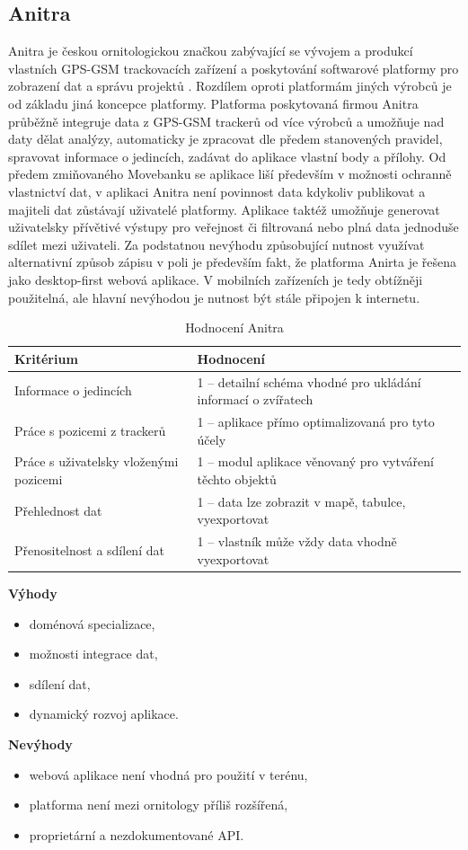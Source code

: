 \subsection{Anitra}

Anitra je českou ornitologickou značkou zabývající se vývojem a produkcí vlastních GPS-GSM trackovacích zařízení a poskytování softwarové platformy pro zobrazení dat a správu projektů \cite{krouzkovaniPtakuAnitra}. Rozdílem oproti platformám jiných výrobců je od základu jiná koncepce platformy. Platforma poskytovaná firmou Anitra průběžně integruje data z GPS-GSM trackerů od více výrobců a umožňuje nad daty dělat analýzy, automaticky je zpracovat dle předem stanovených pravidel, spravovat informace o jedincích, zadávat do aplikace vlastní body a přílohy. Od předem zmiňovaného Movebanku se aplikace liší především v možnosti ochranně vlastnictví dat, v aplikaci Anitra není povinnost data kdykoliv publikovat a majiteli dat zůstávají uživatelé platformy. Aplikace taktéž umožňuje generovat uživatelsky přívětivé výstupy pro veřejnost či filtrovaná nebo plná data jednoduše sdílet mezi uživateli. Za podstatnou nevýhodu způsobující nutnost využívat alternativní způsob zápisu v poli je především fakt, že platforma Anirta je řešena jako desktop-first webová aplikace. V mobilních zařízeních je tedy obtížněji použitelná, ale hlavní nevýhodou je nutnost být stále připojen k internetu.

\begin{table}[H]
	\begin{tabularx}{\textwidth}{ | X | X | }
		\hline			
		Kritérium                              & Hodnocení \\
		\hline			
		Informace o jedincích                  & 1 -- detailní schéma vhodné pro ukládání informací o zvířatech          \\
		\hline
		Práce s pozicemi z trackerů            & 1 -- aplikace přímo optimalizovaná pro tyto účely          \\
		\hline
		Práce s uživatelsky vloženými pozicemi & 1 -- modul aplikace věnovaný pro vytváření těchto objektů          \\
		\hline
		Přehlednost dat                        & 1 -- data lze zobrazit v mapě, tabulce, vyexportovat          \\
		\hline
		Přenositelnost a sdílení dat           & 1 -- vlastník může vždy data vhodně vyexportovat          \\
		\hline	
	\end{tabularx}
	\caption{Hodnocení Anitra}
\end{table}
\textbf{Výhody}
\begin{itemize}
	\item doménová specializace,
	\item možnosti integrace dat,
	\item sdílení dat,
	\item dynamický rozvoj aplikace.
\end{itemize}

\textbf{Nevýhody}
\begin{itemize}
	\item webová aplikace není vhodná pro použití v terénu,
	\item platforma není mezi ornitology příliš rozšířená,
	\item proprietární a nezdokumentované API.
\end{itemize}

